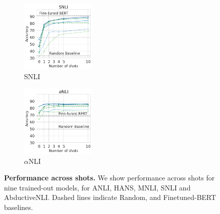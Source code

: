 \begin{figure}[t]
\begin{subfigure}[b]{0.19\textwidth}
    \includegraphics[height=3.45cm, trim=25mm 0 0 0, clip]{figures/snli}
    \caption{SNLI}
    \label{fig:snli}
    \end{subfigure}
    \begin{subfigure}[b]{0.19\textwidth}
    \centering
    \includegraphics[height=3.45cm, trim=25mm 0 0 0, clip]{figures/abductivenli}
    \caption{$\alpha$NLI}
    \label{fig:alphanli}
    \end{subfigure}
    \caption{\textbf{Performance across shots.} We show performance across shots for nine trained-out models, for ANLI, HANS, MNLI, SNLI and AbductiveNLI. Dashed lines indicate Random, and Finetuned-BERT baselines.}\label{fig:shot_performance}
\end{figure}


